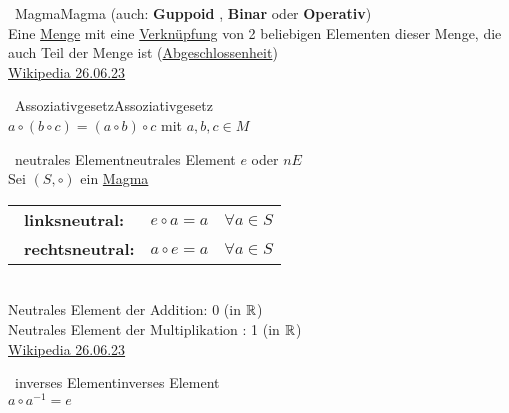		\begin{proposition}{\currentboxsection \ Magma}{Magma} \label{magma} 
			\hspace{5.8cm} (auch:
			\textbf{Guppoid} \label{guppoid} ,
			\textbf{Binar} \label{binar}  oder
			\textbf{Operativ}) \label{operativ}  \\
			Eine \hyperref[menge]{Menge} mit eine \hyperref[verknuepfung]{Verknüpfung} von 2 beliebigen Elementen dieser Menge, die auch Teil der Menge ist (\hyperref[abgeschlossenheit_menge]{Abgeschlossenheit}) \\
			\href{https://de.wikipedia.org/wiki/Magma}{Wikipedia 26.06.23}
		\end{proposition}
		
		\begin{proposition}{\currentboxsection \ Assoziativgesetz}{Assoziativgesetz} \label{assoziativ}  \\
			$a \circ (b \circ c) = (a \circ b) \circ c$ \quad mit $a, b, c \in M$
		\end{proposition}
		
		\begin{proposition}{\currentboxsection \ neutrales Element}{neutrales Element} \label{neutral_element}  \hspace{9cm} $e$ oder $nE$ \\
			Sei $(S, \circ)$ ein \hyperref[magma]{Magma} \\
			\begin{tabular}{@{}ll@{}}
				\textbullet\ \textbf{linksneutral:} & $e \circ a = a \quad \forall a \in S$ \\
				\textbullet\ \textbf{rechtsneutral:} & $a \circ e = a \quad \forall a \in S$ \\
			\end{tabular} \\
			Neutrales Element der Addition: 0 (in $\mathbb{R}$) \\
			Neutrales Element der Multiplikation : 1 (in $\mathbb{R}$) \\
			\href{https://de.wikipedia.org/wiki/Neutrales_Element}{Wikipedia 26.06.23}
		\end{proposition}
		
		\begin{proposition}{\currentboxsection \ inverses Element}{inverses Element} \label{invers_element}  \\
			$a \circ a^{-1} = e$
		\end{proposition}
		
